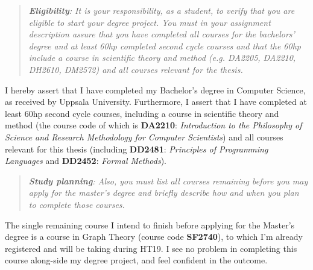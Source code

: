 \documentclass[12pt, a4paper]{article}
\begin{document}
\begin{quote}
	\textit{\textbf{Eligibility}: It is your responsibility, as a student, to verify that you are eligible to start your degree project. You must in your assignment description assure that you have completed all courses for the bachelors' degree and at least 60hp completed second cycle courses and that the 60hp include a course in scientific theory and method (e.g. DA2205, DA2210, DH2610, DM2572) and all courses relevant for the thesis.}
\end{quote}

I hereby assert that I have completed my Bachelor's degree in Computer Science, as received by Uppsala University. Furthermore, I assert that I have completed at least 60hp second cycle courses, including a course in scientific theory and method (the course code of which is \textbf{DA2210}: \textit{Introduction to the Philosophy of Science and Research Methodology for Computer Scientists}) and all courses relevant for this thesis (including \textbf{DD2481}: \textit{Principles of Programming Languages} and \textbf{DD2452}: \textit{Formal Methods}).

\begin{quote}
	\textit{\textbf{Study planning}: Also, you must list all courses remaining before you may apply for the master's degree and briefly describe how and when you plan to complete those courses.}
\end{quote}

The single remaining course I intend to finish before applying for the Master's degree is a course in Graph Theory (course code \textbf{SF2740}), to which I'm already registered and will be taking during HT19. I see no problem in completing this course along-side my degree project, and feel confident in the outcome.







%
\end{document}
